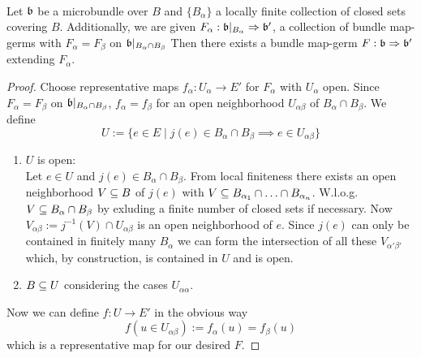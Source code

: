  \\
Let $\mathfrak{b}$ be a microbundle over $B$ and $\{B_\alpha\}$ a locally finite collection of closed sets covering $B$.
Additionally, we are given $F_\alpha: \mathfrak{b}\vert_{B_\alpha} \Rightarrow \mathfrak{b}'$, a collection of bundle map-germs with
$F_\alpha = F_\beta$ on $\mathfrak{b}\vert_{B_\alpha \cap B_\beta}$
Then there exists a bundle map-germ $F: \mathfrak{b} \Rightarrow \mathfrak{b}'$ extending $F_\alpha$.
\begin{proof}
Choose representative maps $f_\alpha: U_\alpha \to E'$ for $F_\alpha$ with $U_\alpha$ open.
Since $F_\alpha = F_\beta$ on $\mathfrak{b}\vert_{B_\alpha \cap B_\beta}$, $f_\alpha = f_\beta$ for an open neighborhood $U_{\alpha\beta}$ of $B_\alpha \cap B_\beta$.
We define
\[ U := \{ e \in E \mid j(e) \in B_\alpha \cap B_\beta \implies e \in U_{\alpha\beta} \}\]
\begin{enumerate}
    \item $U$ is open: \\
    Let $e \in U$ and $j(e) \in B_\alpha \cap B_\beta$.
    From local finiteness there exists an open neighborhood $V \subseteq{} B$ of $j(e)$ with $V \subseteq{} B_{\alpha_1} \cap \ldots \cap B_{\alpha_n}$.
    W.l.o.g. $V \subseteq{} B_\alpha \cap B_\beta$ by exluding a finite number of closed sets if necessary.
    Now $V_{\alpha\beta} := j^{-1}(V) \cap U_{\alpha\beta}$ is an open neighborhood of $e$.
    Since $j(e)$ can only be contained in finitely many $B_\alpha$ we can form the intersection of all these $V_{\alpha'\beta'}$
    which, by construction, is contained in $U$ and is open.
    \item $B \subseteq{} U$ considering the cases $U_{\alpha\alpha}$.
\end{enumerate}

Now we can define $f: U \to E'$ in the obvious way
\[ f(u \in U_{\alpha\beta}) := f_\alpha(u) = f_\beta(u) \]
which is a representative map for our desired $F$.
\end{proof}